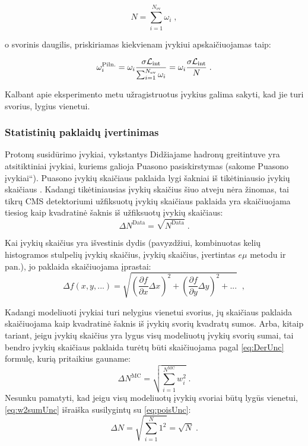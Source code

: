 \documentclass[a4paper, 12pt]{article}
\newcommand{\ltq}[1]{{\quotedblbase{}#1\textquotedblleft{}}}
\newcommand{\Lumi}{{\cal L}_\mathrm{int}}
\newlength\q
\begin{document}
\begin{equation}
	N = \sum_{i=1}^{N_{\mathrm{ev}}} \omega_{i} \; ,
	\label{eq:NLOweight}
\end{equation}

o svorinis daugilis, priskiriamas kiekvienam įvykiui apskaičiuojamas taip:

\begin{equation}
	\omega_{i}^{\mathrm{Piln.}} = \omega_{i} \frac{ \sigma\Lumi }{ \sum_{i=1}^{N_{\mathrm{ev}}}\omega_{i} } =
	\omega_{i} \frac{ \sigma\Lumi }{N} \; .
\end{equation}

Kalbant apie eksperimento metu užragistruotus įvykius galima sakyti, kad jie turi svorius, lygius vienetui.


\subsubsection{Statistinių paklaidų įvertinimas}
Protonų susidūrimo įvykiai, vykstantys Didžiajame hadronų greitintuve yra atsitiktiniai įvykiai, kuriems galioja Puasono pasiskirstymas (sakome \ltq{Puasono įvykiai}). Puasono įvykių skaičiaus paklaida lygi šakniai iš tikėtiniausio įvykių skaičiaus \cite{Poisson}. Kadangi tikėtiniausias įvykių skaičius šiuo atveju nėra žinomas, tai tikrų CMS detektoriumi užfiksuotų įvykių skaičiaus paklaida yra skaičiuojama tiesiog kaip kvadratinė šaknis iš užfiksuotų įvykių skaičiaus:
\begin{equation}
\Delta N^{\mathrm{Data}} = \sqrt{N^{\mathrm{Data}}} \; .
\label{eq:poisUnc}
\end{equation}

Kai įvykių skaičius yra išvestinis dydis (pavyzdžiui, kombinuotas kelių histogramos stulpelių įvykių skaičius, įvykių skaičius, įvertintas $e\mu$ metodu ir pan.), jo paklaida skaičiuojama įprastai:
\begin{equation}
\Delta f(x, y, ...) = \sqrt{\left(\frac{\partial f}{\partial x}\Delta x\right)^{2}+\left(\frac{\partial f}{\partial y}\Delta y\right)^{2}+...} \;\; \mathrm{,}
\label{eq:DerUnc}
\end{equation}

Kadangi modeliuoti įvykiai turi nelygius vienetui svorius, jų skaičiaus paklaida skaičiuojama kaip kvadratinė šaknis iš įvykių svorių kvadratų sumos. Arba, kitaip tariant, jeigu įvykių skaičius yra lygus visų modeliuotų įvykių svorių sumai, tai bendro įvykių skaičiaus paklaida turėtų būti skaičiuojama pagal \eqref{eq:DerUnc} formulę, kurią pritaikius gauname:
\begin{equation}
\Delta N^{\mathrm{MC}} = \sqrt{\sum_{i=1}^{N^{\mathrm{MC}}}w_{i}^{2}} \; .
\label{eq:w2sumUnc}
\end{equation}
Nesunku pamatyti, kad jeigu visų modeliuotų įvykių svoriai būtų lygūs vienetui, \eqref{eq:w2sumUnc} išraiška susilygintų su \eqref{eq:poisUnc}:
\begin{equation}
\Delta N = \sqrt{\sum_{i=1}^{N}1^{2}}=\sqrt{N} \; .
\label{eq:Useless}
\end{equation}
\end{document}
